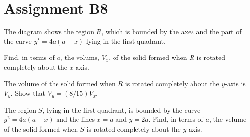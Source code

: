 \section{Assignment B8}

\begin{problem}
    The diagram shows the region $R$, which is bounded by the axes and the part of the curve $y^2 = 4a(a-x)$ lying in the first quadrant.

    Find, in terms of $a$, the volume, $V_x$, of the solid formed when $R$ is rotated completely about the $x$-axis.

    The volume of the solid formed when $R$ is rotated completely about the $y$-axis is $V_y$. Show that $V_y = (8/15) V_x$.

    The region $S$, lying in the first quadrant, is bounded by the curve $y^2 = 4a(a-x)$ and the lines $x = a$ and $y = 2a$. Find, in terms of $a$, the volume of the solid formed when $S$ is rotated completely about the $y$-axis.

    \begin{center}
    \end{center}
\end{problem}
